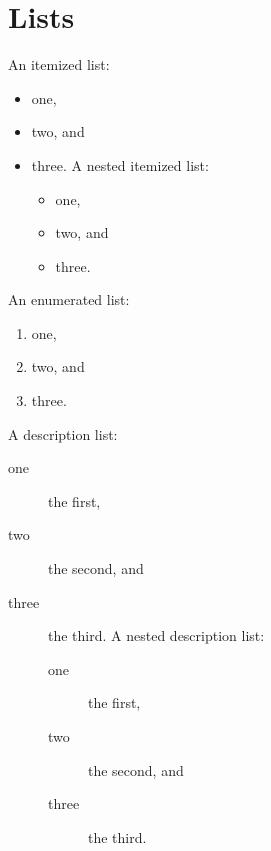 \documentclass{korigamik}
\begin{document}
\section{Lists}
An itemized list:
\begin{itemize}
	\item one,
	\item two, and
	\item three.
	      A nested itemized list:
	      \begin{itemize}
		      \item one,
		      \item two, and
		      \item three.
	      \end{itemize}
\end{itemize}
An enumerated list:
\begin{enumerate}
	\item one,
	\item two, and
	\item three.
\end{enumerate}
A description list:
\begin{description}
	\item [one] the first,
	\item [two] the second, and
	\item [three] the third. A nested description list:
	      \begin{description}
		      \item [one] the first,
		      \item [two] the second, and
		      \item [three] the third.
	      \end{description}
\end{description}
\end{document}
